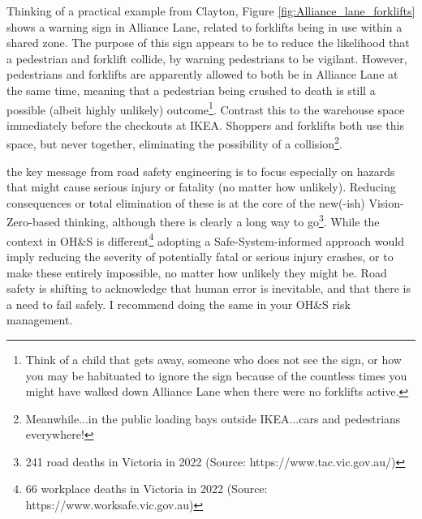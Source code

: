 \documentclass{tufte-handout}
\begin{document}
Thinking of a practical example from Clayton,  Figure \ref{fig:Alliance_lane_forklifts} shows a warning sign in Alliance Lane, related to forklifts being in use within a shared zone. The purpose of this sign appears to be to reduce the likelihood that a pedestrian and forklift collide, by warning pedestrians to be vigilant. However, pedestrians and forklifts are apparently allowed to both be in Alliance Lane at the same time, meaning that a pedestrian being crushed to death is still a possible (albeit highly unlikely) outcome\footnote{Think of a child that gets away, someone who does not see the sign, or how you may be habituated to ignore the sign because of the countless times you might have walked down Alliance Lane when there were no forklifts active.}. Contrast this to the warehouse space immediately before the checkouts at IKEA. Shoppers and forklifts both use this space, but never together, eliminating the possibility of a collision\footnote{Meanwhile...in the public loading bays outside IKEA...cars and pedestrians everywhere!}. 


 the key message from road safety engineering is to focus especially on hazards that might cause serious injury or fatality (no matter how unlikely). Reducing consequences or total elimination of these is at the core of the new(-ish) Vision-Zero-based thinking, although there is clearly a long way to go\footnote{241 road deaths in Victoria in 2022 (Source: https://www.tac.vic.gov.au/)}. While the context in OH\&S is different\footnote{66 workplace deaths in Victoria in 2022 (Source: https://www.worksafe.vic.gov.au)} adopting a Safe-System-informed approach would imply reducing the severity of potentially fatal or serious injury crashes, or to make these entirely impossible, no matter how unlikely they might be. Road safety is shifting to acknowledge that human error is inevitable, and that there is a need to fail safely. I recommend doing the same in your OH\&S risk management.




\end{document}
